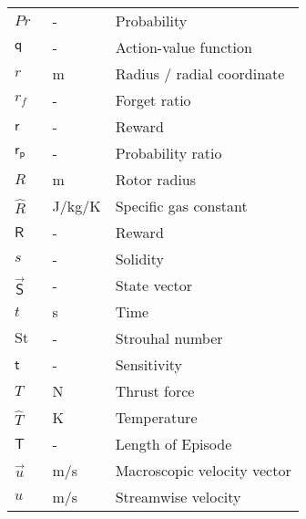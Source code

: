 \begin{longtable}{p{5cm}p{4cm}p{5cm}}
    $Pr$					& \SI{}{-}		& Probability \\
    $\mathsf{q}$			& \SI{}{-}		& Action-value function \\
    $r$						& \SI{}{m}		& Radius / radial coordinate \\
    $r_f$					& \SI{}{-}		& Forget ratio \\
    $\mathsf{r}$			& \SI{}{-}		& Reward \\	
    $\mathsf{r_p}$			& \SI{}{-}		& Probability ratio \\
    $R$						& \SI{}{m}		& Rotor radius \\
    $\hat{R}$               & \SI{}{J/kg/K} & Specific gas constant \\ 
    $\mathsf{R}$			& \SI{}{-}		& Reward \\	
    $s$						& \SI{}{-}		& Solidity \\
    $\vec{\mathsf{S}}$		& \SI{}{-}		& State vector \\
    $t$                     & \SI{}{s}      & Time  \\
    $\mathrm{St}$			& \SI{}{-}		& Strouhal number \\
    $\mathsf{t}$			& \SI{}{-}		& Sensitivity \\
    $T$                     & \SI{}{N}      & Thrust force \\
    $\hat{T}$				& \SI{}{K}		& Temperature \\
    $\mathsf{T}$			& \SI{}{-}		& Length of Episode \\
    $\vec{u}$               & \SI{}{m/s}    & Macroscopic velocity vector \\
    $u$                     & \SI{}{m/s}    & Streamwise velocity \\

\end{longtable}
